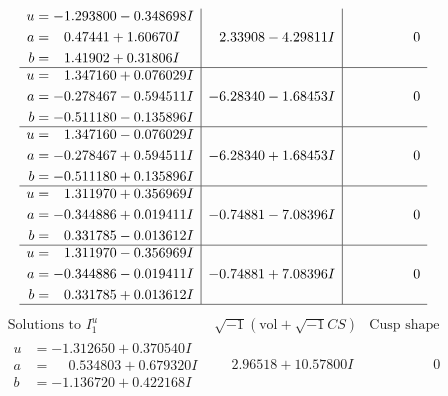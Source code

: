 \documentclass[1p]{elsarticle_modified}
\theoremstyle{definition}
\newcommand{\I}{\sqrt{-1}}
\begin{document}
$$\begin{array}{c|c|c}
\begin{aligned}
u &= -1.293800 - 0.348698 I \\
a &= \phantom{-}0.47441 + 1.60670 I \\
b &= \phantom{-}1.41902 + 0.31806 I\end{aligned}
 & \phantom{-}2.33908 - 4.29811 I & \phantom{-0.000000 } 0 \\ \hline\begin{aligned}
u &= \phantom{-}1.347160 + 0.076029 I \\
a &= -0.278467 - 0.594511 I \\
b &= -0.511180 - 0.135896 I\end{aligned}
 & -6.28340 - 1.68453 I & \phantom{-0.000000 } 0 \\ \hline\begin{aligned}
u &= \phantom{-}1.347160 - 0.076029 I \\
a &= -0.278467 + 0.594511 I \\
b &= -0.511180 + 0.135896 I\end{aligned}
 & -6.28340 + 1.68453 I & \phantom{-0.000000 } 0 \\ \hline\begin{aligned}
u &= \phantom{-}1.311970 + 0.356969 I \\
a &= -0.344886 + 0.019411 I \\
b &= \phantom{-}0.331785 - 0.013612 I\end{aligned}
 & -0.74881 - 7.08396 I & \phantom{-0.000000 } 0 \\ \hline\begin{aligned}
u &= \phantom{-}1.311970 - 0.356969 I \\
a &= -0.344886 - 0.019411 I \\
b &= \phantom{-}0.331785 + 0.013612 I\end{aligned}
 & -0.74881 + 7.08396 I & \phantom{-0.000000 } 0\\
 \hline 
 \end{array}$$\newpage$$\begin{array}{c|c|c}  
\text{Solutions to }I^u_{1}& \I (\text{vol} + \sqrt{-1}CS) & \text{Cusp shape}\\
 \hline 
\begin{aligned}
u &= -1.312650 + 0.370540 I \\
a &= \phantom{-}0.534803 + 0.679320 I \\
b &= -1.136720 + 0.422168 I\end{aligned}
 & \phantom{-}2.96518 + 10.57800 I & \phantom{-0.000000 } 0 \\ \hline\begin{aligned}

\end{aligned}
\end{array}$$
\end{document}
